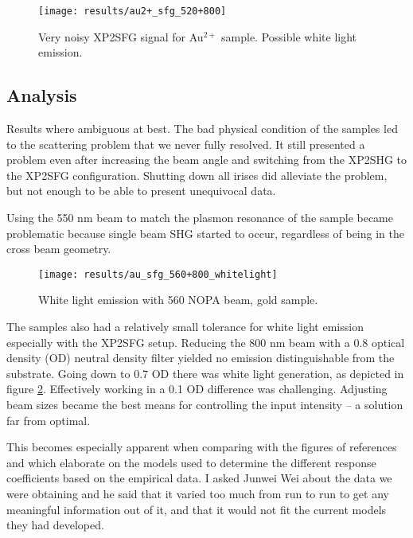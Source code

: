 \begin{figure}[h]
\centering
\texttt{[image: results/au2+\_sfg\_520+800]}
\caption[Noisy XP2SFG signal for Au$^{2+}$ sample.]{Very noisy XP2SFG signal for Au$^{2+}$ sample. Possible white light emission.\label{fig_sfg_au2+}}
\end{figure}

\subsection{Analysis}
Results where ambiguous at best. The bad physical condition of the samples led to the scattering problem that we never fully resolved. It still presented a problem even after increasing the beam angle and switching from the XP2SHG to the XP2SFG configuration. Shutting down all irises did alleviate the problem, but not enough to be able to present unequivocal data.

Using the 550 nm beam to match the plasmon resonance of the sample became problematic because single beam SHG started to occur, regardless of being in the cross beam geometry.

\begin{figure}[h]
\centering
\texttt{[image: results/au\_sfg\_560+800\_whitelight]}
\caption[White light emission, gold sample.]{White light emission with 560 NOPA beam, gold sample.\label{fig_au_sfg_whitelight}}
\end{figure}

The samples also had a relatively small tolerance for white light emission especially with the XP2SFG setup. Reducing the 800 nm beam with a 0.8 optical density (OD) neutral density filter yielded no emission distinguishable from the substrate. Going down to 0.7 OD there was white light generation, as depicted in figure \ref{fig_au_sfg_whitelight}. Effectively working in a 0.1 OD difference was challenging. Adjusting beam sizes became the best means for controlling the input intensity -- a solution far from optimal. 

This becomes especially apparent when comparing with the figures of references \cite{PhysRevB.84.165316} and \cite{wirth2008second} which elaborate on the models used to determine the different response coefficients based on the empirical data. I asked Junwei Wei about the data we were obtaining and he said that it varied too much from run to run to get any meaningful information out of it, and that it would not fit the current models they had developed.

